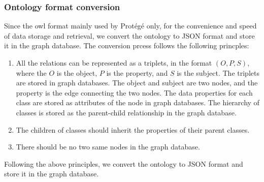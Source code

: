 \subsubsection{Ontology format conversion}
Since the owl format mainly used by Protégé only, for the convenience and speed of data storage and retrieval, we convert the ontology to JSON format and store it in the graph database.
The conversion prcess follows the following princples:
\begin{enumerate}
    \item All the relations can be represented as a triplets, in the format \((O,P,S)\), where the \(O\) is the object, \(P\) is the property, and \(S\) is the subject.
    The triplets are stored in graph databases. The object and subject are two nodes, and the property is the edge connecting the two nodes.
    The data properties for each class are stored as attributes of the node in graph databases. The hierarchy of classes is stored as the parent-child relationship in the graph database.
    \item The children of classes should inherit the properties of their parent classes.
    \item There should be no two same nodes in the graph database.
\end{enumerate}
Following the above principles, we convert the ontology to JSON format and store it in the graph database. 


